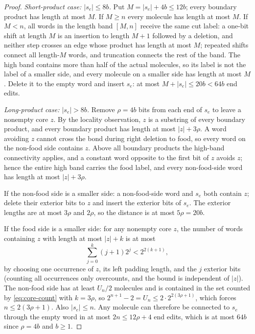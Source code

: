 \documentclass[11pt,reqno]{amsart}
\theoremstyle{plain}
\theoremstyle{definition}
\theoremstyle{remark}
\numberwithin{equation}{section}
\begin{document}
\begin{proof}
\emph{Short-product case: $|s_e|\le8b$.} Put $M=|s_e|+4b\le12b$; every boundary product has length at most $M$. If $M\ge n$ every molecule has length at most $M$. If $M<n$, all words in the length band $[M,n]$ receive the same cut label: a one-bit shift at length $M$ is an insertion to length $M+1$ followed by a deletion, and neither step crosses an edge whose product has length at most $M$; repeated shifts connect all length-$M$ words, and truncation connects the rest of the band. The high band contains more than half of the actual molecules, so its label is not the label of a smaller side, and every molecule on a smaller side has length at most $M$. Delete it to the empty word and insert $s_e$: at most $M+|s_e|\le20b<64b$ end edits.

\emph{Long-product case: $|s_e|>8b$.} Remove $\rho=4b$ bits from each end of $s_e$ to leave a nonempty core $z$. By the locality observation, $z$ is a substring of every boundary product, and every boundary product has length at most $|z|+3\rho$. A word avoiding $z$ cannot cross the bond during right deletion to food, so every word on the non-food side contains $z$. Above all boundary products the high-band connectivity applies, and a constant word opposite to the first bit of $z$ avoids $z$; hence the entire high band carries the food label, and every non-food-side word has length at most $|z|+3\rho$.

If the non-food side is a smaller side: a non-food-side word and $s_e$ both contain $z$; delete their exterior bits to $z$ and insert the exterior bits of $s_e$. The exterior lengths are at most $3\rho$ and $2\rho$, so the distance is at most $5\rho=20b$.

If the food side is a smaller side: for any nonempty core $z$, the number of words containing $z$ with length at most $|z|+k$ is at most
\begin{equation}\label{eq:core-count}
\sum_{j=0}^{k}(j+1)2^{j}<2^{2(k+1)},
\end{equation}
by choosing one occurrence of $z$, its left padding length, and the $j$ exterior bits (counting all occurrences only overcounts, and the bound is independent of $|z|$). The non-food side has at least $U_n/2$ molecules and is contained in the set counted by \eqref{eq:core-count} with $k=3\rho$, so $2^{n+1}-2=U_n\le2\cdot2^{2(3\rho+1)}$, which forces $n\le2(3\rho+1)$. Also $|s_e|\le n$. Any molecule can therefore be connected to $s_e$ through the empty word in at most $2n\le12\rho+4$ end edits, which is at most $64b$ since $\rho=4b$ and $b\ge1$.
\end{proof}
\end{document}
